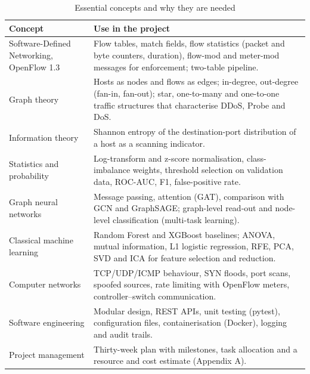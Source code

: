\begin{table}[htbp]
\centering
\caption{Essential concepts and why they are needed}
\label{tab:concepts}
\small
\begin{tabularx}{\textwidth}{|p{3.3cm}|X|}
\hline
\textbf{Concept} & \textbf{Use in the project} \\ \hline
Software-Defined Networking, OpenFlow 1.3 & Flow tables, match fields, flow statistics (packet and byte counters, duration), flow-mod and meter-mod messages for enforcement; two-table pipeline. \\ \hline
Graph theory & Hosts as nodes and flows as edges; in-degree, out-degree (fan-in, fan-out); star, one-to-many and one-to-one traffic structures that characterise DDoS, Probe and DoS. \\ \hline
Information theory & Shannon entropy of the destination-port distribution of a host as a scanning indicator. \\ \hline
Statistics and probability & Log-transform and z-score normalisation, class-imbalance weights, threshold selection on validation data, ROC-AUC, F1, false-positive rate. \\ \hline
Graph neural networks & Message passing, attention (GAT), comparison with GCN and GraphSAGE; graph-level read-out and node-level classification (multi-task learning). \\ \hline
Classical machine learning & Random Forest and XGBoost baselines; ANOVA, mutual information, L1 logistic regression, RFE, PCA, SVD and ICA for feature selection and reduction. \\ \hline
Computer networks & TCP/UDP/ICMP behaviour, SYN floods, port scans, spoofed sources, rate limiting with OpenFlow meters, controller--switch communication. \\ \hline
Software engineering & Modular design, REST APIs, unit testing (pytest), configuration files, containerisation (Docker), logging and audit trails. \\ \hline
Project management & Thirty-week plan with milestones, task allocation and a resource and cost estimate (Appendix A). \\ \hline
\end{tabularx}
\end{table}

